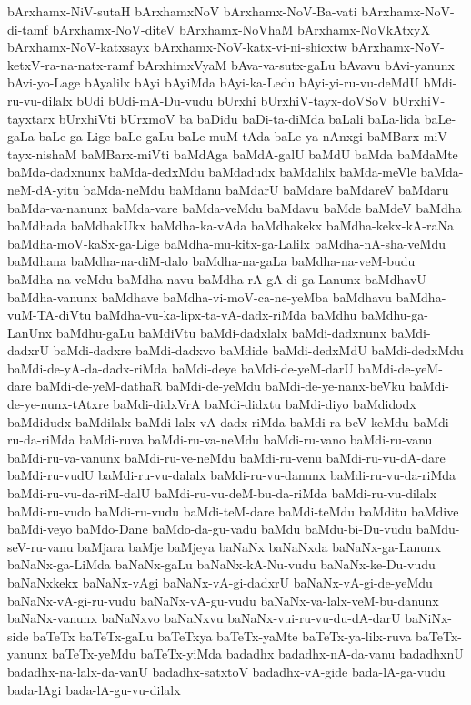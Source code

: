 {bArxhamx-NiV-sutaH
bArxhamxNoV
bArxhamx-NoV-Ba-vati
bArxhamx-NoV-di-tamf
bArxhamx-NoV-diteV
bArxhamx-NoVhaM
bArxhamx-NoVkAtxyX
bArxhamx-NoV-katxsayx
bArxhamx-NoV-katx-vi-ni-shicxtw
bArxhamx-NoV-ketxV-ra-na-natx-ramf
bArxhimxVyaM
bAva-va-sutx-gaLu
bAvavu
bAvi-yanunx
bAvi-yo-Lage
bAyalilx
bAyi
bAyiMda
bAyi-ka-Ledu
bAyi-yi-ru-vu-deMdU
bMdi-ru-vu-dilalx
bUdi
bUdi-mA-Du-vudu
bUrxhi
bUrxhiV-tayx-doVSoV
bUrxhiV-tayxtarx
bUrxhiVti
bUrxmoV
ba
baDidu
baDi-ta-diMda
baLali
baLa-lida
baLe-gaLa
baLe-ga-Lige
baLe-gaLu
baLe-muM-tAda
baLe-ya-nAnxgi
baMBarx-miV-tayx-nishaM
baMBarx-miVti
baMdAga
baMdA-galU
baMdU
baMda
baMdaMte
baMda-dadxnunx
baMda-dedxMdu
baMdadudx
baMdalilx
baMda-meVle
baMda-neM-dA-yitu
baMda-neMdu
baMdanu
baMdarU
baMdare
baMdareV
baMdaru
baMda-va-nanunx
baMda-vare
baMda-veMdu
baMdavu
baMde
baMdeV
baMdha
baMdhada
baMdhakUkx
baMdha-ka-vAda
baMdhakekx
baMdha-kekx-kA-raNa
baMdha-moV-kaSx-ga-Lige
baMdha-mu-kitx-ga-Lalilx
baMdha-nA-sha-veMdu
baMdhana
baMdha-na-diM-dalo
baMdha-na-gaLa
baMdha-na-veM-budu
baMdha-na-veMdu
baMdha-navu
baMdha-rA-gA-di-ga-Lanunx
baMdhavU
baMdha-vanunx
baMdhave
baMdha-vi-moV-ca-ne-yeMba
baMdhavu
baMdha-vuM-TA-diVtu
baMdha-vu-ka-lipx-ta-vA-dadx-riMda
baMdhu
baMdhu-ga-LanUnx
baMdhu-gaLu
baMdiVtu
baMdi-dadxlalx
baMdi-dadxnunx
baMdi-dadxrU
baMdi-dadxre
baMdi-dadxvo
baMdide
baMdi-dedxMdU
baMdi-dedxMdu
baMdi-de-yA-da-dadx-riMda
baMdi-deye
baMdi-de-yeM-darU
baMdi-de-yeM-dare
baMdi-de-yeM-dathaR
baMdi-de-yeMdu
baMdi-de-ye-nanx-beVku
baMdi-de-ye-nunx-tAtxre
baMdi-didxVrA
baMdi-didxtu
baMdi-diyo
baMdidodx
baMdidudx
baMdilalx
baMdi-lalx-vA-dadx-riMda
baMdi-ra-beV-keMdu
baMdi-ru-da-riMda
baMdi-ruva
baMdi-ru-va-neMdu
baMdi-ru-vano
baMdi-ru-vanu
baMdi-ru-va-vanunx
baMdi-ru-ve-neMdu
baMdi-ru-venu
baMdi-ru-vu-dA-dare
baMdi-ru-vudU
baMdi-ru-vu-dalalx
baMdi-ru-vu-danunx
baMdi-ru-vu-da-riMda
baMdi-ru-vu-da-riM-dalU
baMdi-ru-vu-deM-bu-da-riMda
baMdi-ru-vu-dilalx
baMdi-ru-vudo
baMdi-ru-vudu
baMdi-teM-dare
baMdi-teMdu
baMditu
baMdive
baMdi-veyo
baMdo-Dane
baMdo-da-gu-vadu
baMdu
baMdu-bi-Du-vudu
baMdu-seV-ru-vanu
baMjara
baMje
baMjeya
baNaNx
baNaNxda
baNaNx-ga-Lanunx
baNaNx-ga-LiMda
baNaNx-gaLu
baNaNx-kA-Nu-vudu
baNaNx-ke-Du-vudu
baNaNxkekx
baNaNx-vAgi
baNaNx-vA-gi-dadxrU
baNaNx-vA-gi-de-yeMdu
baNaNx-vA-gi-ru-vudu
baNaNx-vA-gu-vudu
baNaNx-va-lalx-veM-bu-danunx
baNaNx-vanunx
baNaNxvo
baNaNxvu
baNaNx-vui-ru-vu-du-dA-darU
baNiNx-side
baTeTx
baTeTx-gaLu
baTeTxya
baTeTx-yaMte
baTeTx-ya-lilx-ruva
baTeTx-yanunx
baTeTx-yeMdu
baTeTx-yiMda
badadhx
badadhx-nA-da-vanu
badadhxnU
badadhx-na-lalx-da-vanU
badadhx-satxtoV
badadhx-vA-gide
bada-lA-ga-vudu
bada-lAgi
bada-lA-gu-vu-dilalx
}
